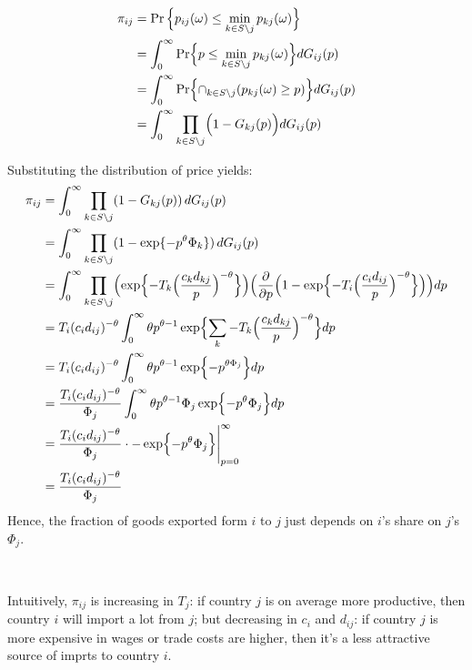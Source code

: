 \begin{align*}
    \pi_{ij} &= \operatorname{Pr} \Big\{ p_{ij}(\omega) \leq \min_{k \in S \setminus j} p_{kj}(\omega) \Bigr\} \\
    &= \int_0^{\infty} \operatorname{Pr} \Bigl\{ p \leq \min_{k \in S \setminus j} p_{kj}(\omega) \Bigr\} d G_{ij}(p) \\ 
    &= \int_0^{\infty} \operatorname{Pr} \Bigl\{\cap_{k \in S \setminus j} (p_{kj}(\omega) \geq p) \Bigr\} d G_{ij}(p) \\
    &= \int_0^{\infty} \prod_{k \in S \setminus j} \Bigl(1 - G_{kj}(p) \Bigr) d G_{ij}(p)
\end{align*}

Substituting the distribution of price yields:
\begin{align*}
    \pi_{ij} &= \int_0^{\infty} \prod_{k \in S \setminus j} (1 - G_{kj}(p)) \, d G_{ij}(p) \\
    &= \int_0^{\infty} \prod_{k \in S \setminus j} (1 - \exp\{-p^{\theta} \Phi_k\}) \, d G_{ij}(p) \\
    &= \int_0^{\infty} \prod_{k \in S \setminus j} \Bigl( \exp\Bigl\{-T_k \Bigl(\frac{c_k d_{kj}}{p}\Bigr)^{-\theta} \Bigr\} \Bigr) \Bigl( \frac{\partial }{\partial p} \Bigl( 1 - \exp \Bigl\{ -T_i \Bigl(\frac{c_i d_{ij}}{p}\Bigr)^{-\theta} \Bigr\} \Bigr) \Bigr) dp \\
    &= T_i (c_i d_{ij})^{-\theta} \int_0^{\infty} \theta p^{\theta-1} \exp \Bigl\{ \sum_k -T_k \Bigl( \frac{c_k d_{kj}}{p} \Bigr)^{-\theta} \Bigr\} dp \\
    &= T_i (c_i d_{ij})^{-\theta} \int_0^{\infty} \theta p^{\theta -1} \exp \Bigl\{-p^{\theta \Phi_j} \Bigr\} dp \\
    &= \frac{T_i (c_i d_{ij})^{-\theta} }{\Phi_j} \int_0^{\infty} \theta p^{\theta-1} \Phi_j \exp \Bigl\{-p^{\theta} \Phi_j \Bigr\} dp \\
    &= \frac{T_i (c_i d_{ij})^{-\theta} }{\Phi_j} \cdot -\exp \Bigl\{-p^{\theta} \Phi_j \Bigr\} \Bigg| _{p=0}^{\infty} \Bigg. \\
    &= \frac{T_i (c_i d_{ij})^{-\theta} }{\Phi_j}
\end{align*}
Hence, the fraction of goods exported form $i$ to $j$ just depends on $i$'s share on $j$'s $\Phi_j$.

\begin{intuition}
    \

    Intuitively, $\pi_{ij}$ is increasing in $T_j$: if country $j$ is on average more productive, then country $i$ will import a lot from $j$;
    but decreasing in $c_i$ and $d_{ij}$: if country $j$ is more expensive in wages or trade costs are higher, then it's a less attractive source of imprts to country $i$.
\end{intuition}

